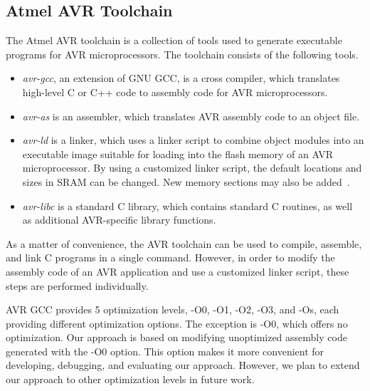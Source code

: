 \subsection{Atmel AVR Toolchain}
\vspace{-5pt}
The Atmel AVR toolchain is a collection of tools used to generate executable programs for AVR microprocessors. The toolchain consists of the following tools.

\begin{itemize}

\item \textit{avr-gcc}, an extension of GNU GCC, is a cross compiler, which translates high-level C or C++ code to assembly code for AVR microprocessors.

\item \textit{avr-as} is an assembler, which translates AVR assembly code to an object file.

\item \textit{avr-ld} is a linker, which uses a linker script to combine object modules into an executable image suitable for loading into the flash memory of an AVR microprocessor. By using a customized linker script, the default locations and sizes in SRAM can be changed. New memory sections may also be added~\cite{sram}.

\item \textit{avr-libc} is a standard C library, which contains standard C routines, as well as additional AVR-specific library functions.

\end{itemize}

As a matter of convenience, the AVR toolchain can be used to compile, assemble, and link C programs in a single command. However, in order to modify the assembly code of an AVR application and use a customized linker script, these steps are performed individually.


AVR GCC provides 5 optimization levels, -O0, -O1, -O2, -O3, and -Os, each providing different optimization options. The exception is -O0, which offers no optimization\cite{hoste2008cole}. Our approach is based on modifying unoptimized assembly code generated with the -O0 option. This option makes it more convenient for developing, debugging, and evaluating our approach. However, we plan to extend our approach to other optimization levels in future work.
